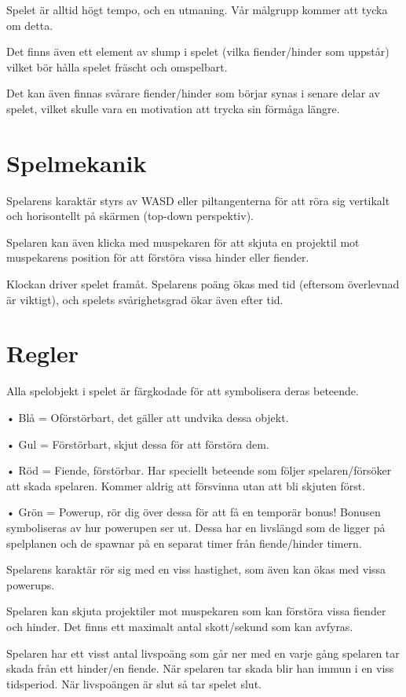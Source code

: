 \documentclass{TDP005mall}
\begin{document}
Spelet är alltid högt tempo, och en utmaning. Vår målgrupp kommer att tycka om detta.

Det finns även ett element av slump i spelet (vilka fiender/hinder som uppstår) vilket bör hålla spelet fräscht och omspelbart.

Det kan även finnas svårare fiender/hinder som börjar synas i senare delar av spelet, vilket skulle vara en motivation att trycka sin förmåga längre.

\section{Spelmekanik}
Spelarens karaktär styrs av WASD eller piltangenterna för att röra sig vertikalt och horisontellt på skärmen (top-down perspektiv).

Spelaren kan även klicka med muspekaren för att skjuta en projektil mot muspekarens position för att förstöra vissa hinder eller fiender.

Klockan driver spelet framåt. Spelarens poäng ökas med tid (eftersom överlevnad är viktigt), och spelets svårighetsgrad ökar även efter tid.

\section{Regler}
Alla spelobjekt i spelet är färgkodade för att symbolisera deras beteende.

• Blå = Oförstörbart, det gäller att undvika dessa objekt.

• Gul = Förstörbart, skjut dessa för att förstöra dem.

• Röd = Fiende, förstörbar. Har speciellt beteende som följer spelaren/försöker att skada spelaren. Kommer aldrig att försvinna utan att bli skjuten först.

• Grön = Powerup, rör dig över dessa för att få en temporär bonus! Bonusen symboliseras av hur powerupen ser ut. Dessa har en livslängd som de ligger på spelplanen och de spawnar på en separat timer från fiende/hinder timern.

Spelarens karaktär rör sig med en viss hastighet, som även kan ökas med vissa powerups.

Spelaren kan skjuta projektiler mot muspekaren som kan förstöra vissa fiender och hinder. Det finns ett maximalt antal skott/sekund som kan avfyras.

Spelaren har ett visst antal livspoäng som går ner med en varje gång spelaren tar skada från ett hinder/en fiende. När spelaren tar skada blir han immun i en viss tidsperiod. När livspoängen är slut så tar spelet slut.
\end{document}
